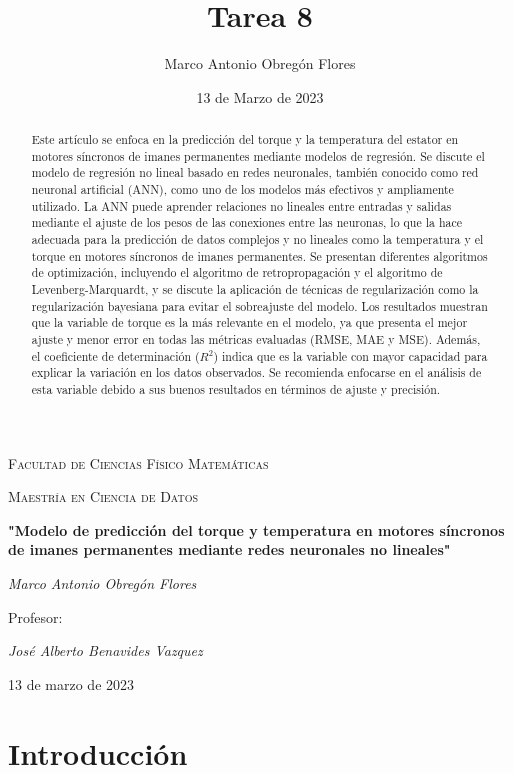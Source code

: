 \documentclass{article}
\title{Tarea 8}
\author{Marco Antonio Obregón Flores}
\date{13 de Marzo de 2023}
\begin{document}
\begin{titlepage}
    \centering
    {\scshape\large Facultad de Ciencias Físico Matemáticas\par}
    {\scshape\large Maestría en Ciencia de Datos\par}
    \vspace{1cm}
    {\huge\bfseries "Modelo de predicción del torque y temperatura en motores síncronos de imanes permanentes mediante redes neuronales no lineales"\par}
    \vspace{2cm}
    {\Large\itshape Marco Antonio Obregón Flores\par}
    \vfill
    {\large Profesor:\par}
    {\Large\itshape José Alberto Benavides Vazquez\par}
    \vspace{1cm}
    {\large 13 de marzo de 2023\par}
\end{titlepage}

\begin{abstract}
Este artículo se enfoca en la predicción del torque y la temperatura del estator en motores síncronos de imanes permanentes mediante modelos de regresión. Se discute el modelo de regresión no lineal basado en redes neuronales, también conocido como red neuronal artificial (ANN), como uno de los modelos más efectivos y ampliamente utilizado. La ANN puede aprender relaciones no lineales entre entradas y salidas mediante el ajuste de los pesos de las conexiones entre las neuronas, lo que la hace adecuada para la predicción de datos complejos y no lineales como la temperatura y el torque en motores síncronos de imanes permanentes. Se presentan diferentes algoritmos de optimización, incluyendo el algoritmo de retropropagación y el algoritmo de Levenberg-Marquardt, y se discute la aplicación de técnicas de regularización como la regularización bayesiana para evitar el sobreajuste del modelo.
Los resultados muestran que la variable de torque es la más relevante en el modelo, ya que presenta el mejor ajuste y menor error en todas las métricas evaluadas (RMSE, MAE y MSE). Además, el coeficiente de determinación ($R^2$) indica que es la variable con mayor capacidad para explicar la variación en los datos observados. Se recomienda enfocarse en el análisis de esta variable debido a sus buenos resultados en términos de ajuste y precisión.
\end{abstract}

\section{Introducción}
\setlength{\parskip}{10pt}
\end{document}
